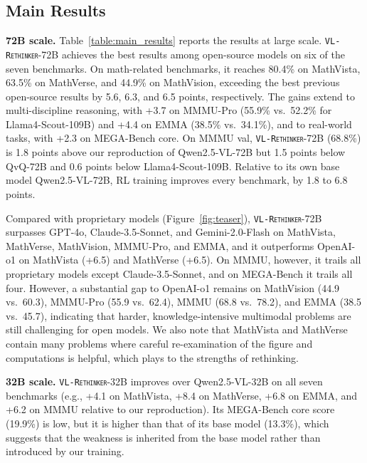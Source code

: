 \documentclass{article}
\newcommand{\model}{\texttt{\textsc{VL-Rethinker}}\xspace}
\begin{document}
\subsection{Main Results}

\textbf{72B scale.} Table~\ref{table:main_results} reports the results at large scale. \model-72B achieves the best results among open-source models on six of the seven benchmarks. On math-related benchmarks, it reaches 80.4\% on MathVista, 63.5\% on MathVerse, and 44.9\% on MathVision, exceeding the best previous open-source results by 5.6, 6.3, and 6.5 points, respectively. The gains extend to multi-discipline reasoning, with +3.7 on MMMU-Pro (55.9\% vs.\ 52.2\% for Llama4-Scout-109B) and +4.4 on EMMA (38.5\% vs.\ 34.1\%), and to real-world tasks, with +2.3 on MEGA-Bench core. On MMMU val, \model-72B (68.8\%) is 1.8 points above our reproduction of Qwen2.5-VL-72B but 1.5 points below QvQ-72B and 0.6 points below Llama4-Scout-109B. Relative to its own base model Qwen2.5-VL-72B, RL training improves every benchmark, by 1.8 to 6.8 points.

Compared with proprietary models (Figure~\ref{fig:teaser}), \model-72B surpasses GPT-4o, Claude-3.5-Sonnet, and Gemini-2.0-Flash on MathVista, MathVerse, MathVision, MMMU-Pro, and EMMA, and it outperforms OpenAI-o1 on MathVista (+6.5) and MathVerse (+6.5). On MMMU, however, it trails all proprietary models except Claude-3.5-Sonnet, and on MEGA-Bench it trails all four. However, a substantial gap to OpenAI-o1 remains on MathVision (44.9 vs.\ 60.3), MMMU-Pro (55.9 vs.\ 62.4), MMMU (68.8 vs.\ 78.2), and EMMA (38.5 vs.\ 45.7), indicating that harder, knowledge-intensive multimodal problems are still challenging for open models. We also note that MathVista and MathVerse contain many problems where careful re-examination of the figure and computations is helpful, which plays to the strengths of rethinking.

\textbf{32B scale.} \model-32B improves over Qwen2.5-VL-32B on all seven benchmarks (e.g., +4.1 on MathVista, +8.4 on MathVerse, +6.8 on EMMA, and +6.2 on MMMU relative to our reproduction). Its MEGA-Bench core score (19.9\%) is low, but it is higher than that of its base model (13.3\%), which suggests that the weakness is inherited from the base model rather than introduced by our training.
\end{document}
